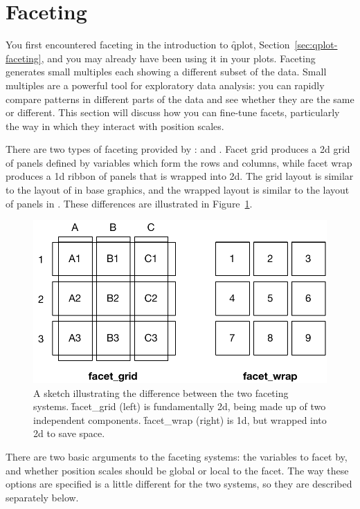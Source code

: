 \section{Faceting}
\label{sec:faceting}

You first encountered faceting in the introduction to \f{qplot}, Section~\ref{sec:qplot-faceting}, and you may already have been using it in your plots.  Faceting generates small multiples each showing a different subset of the data.  Small multiples are a powerful tool for exploratory data analysis: you can rapidly compare patterns in different parts of the data and see whether they are the same or different.  This section will discuss how you can fine-tune facets, particularly the way in which they interact with position scales. 

There are two types of faceting provided by \ggplot:  and .  Facet grid produces a 2d grid of panels defined by variables which form the rows and columns, while facet wrap produces a 1d ribbon of panels that is wrapped into 2d.  The grid layout is similar to the layout of  in base graphics, and the wrapped layout is similar to the layout of panels in .  These differences are illustrated in Figure~\ref{fig:facet-sketch}.

\begin{figure}[htbp]
  \centering
    \includegraphics[width=0.5\linewidth]{position-facets}
  \caption{A sketch illustrating the difference between the two faceting systems.   \f{facet_grid} (left) is fundamentally 2d, being made up of two independent components.  \f{facet_wrap} (right) is 1d, but wrapped into 2d to save space.}
  \label{fig:facet-sketch}
\end{figure}

There are two basic arguments to the faceting systems: the variables to facet by, and whether position scales should be global or local to the facet.  The way these options are specified is a little different for the two systems, so they are described separately below.


